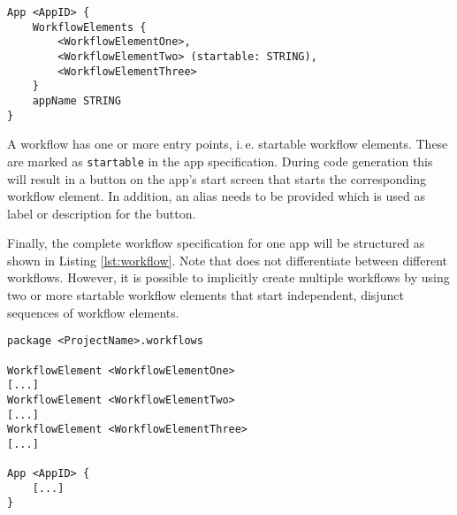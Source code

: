 \begin{lstlisting}[language=MD2, label=lst:app, caption=App definition in \MD]
App <AppID> {
	WorkflowElements {
		<WorkflowElementOne>,
		<WorkflowElementTwo> (startable: STRING),
		<WorkflowElementThree> 
	}
	appName STRING
}
\end{lstlisting}

A workflow has one or more entry points, i.\,e. startable workflow elements. These are marked as {\lstinline!startable!} in the app specification. During code generation this will result in a button on the app's start screen that starts the corresponding workflow element. In addition, an alias needs to be provided which is used as label or description for the button.

Finally, the complete workflow specification for one app will be structured as shown in Listing \ref{lst:workflow}. Note that \MD does not differentiate between different workflows. However, it is possible to implicitly create multiple workflows by using two or more startable workflow elements that start independent, disjunct sequences of workflow elements.

\begin{lstlisting}[language=MD2, label=lst:workflow, caption=Workflow definition in \MD]
package <ProjectName>.workflows

WorkflowElement <WorkflowElementOne>
[...]
WorkflowElement <WorkflowElementTwo>
[...]
WorkflowElement <WorkflowElementThree>
[...]

App <AppID> {
	[...]
}
\end{lstlisting}